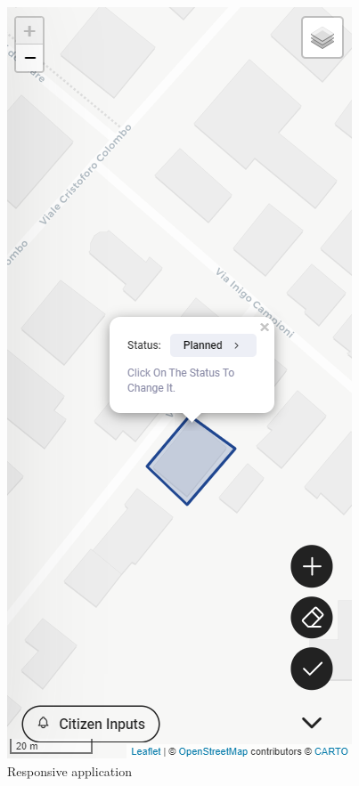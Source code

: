 \begin{figure}[H]
\begin{minipage}{0.24\textwidth}
    \end{minipage}
    \hfill
    \begin{minipage}{0.24\textwidth}
        \centering
        \includegraphics[width=\textwidth]{res/web/mobile-change-status}
    \end{minipage}
    \caption{Responsive application}\label{fig:mobile-compatiable}
\end{figure}

